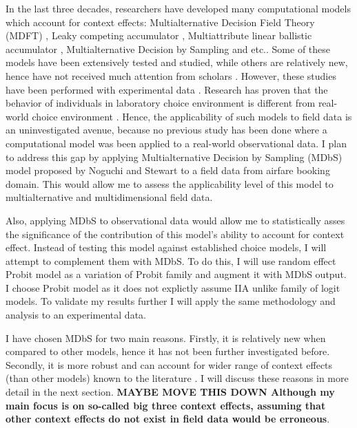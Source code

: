 \documentclass[a4paper,12pt]{article}
\newcommand{\citeyearonly}[1]{\citeyearpar{#1}}
\begin{document}
In the last three decades, researchers have developed many computational models which account for context effects: Multialternative Decision Field Theory (MDFT) \citep{roe2001multialternative}, Leaky competing
accumulator \citep{usher2001time}, Multiattribute linear ballistic accumulator \citep{trueblood2014multiattribute}, Multialternative Decision by Sampling  \citep{noguchi2018multialternative} and etc.. Some of these models have been extensively tested and studied, while others are relatively new, hence have not received much attention from scholars \citep{truebloodEtAl13}. However, these studies have been performed with experimental data \citep{evans2019response, berkowitsch2014rigorously, trueblood2014multiattribute, busemeyer2019cognitive}. Research has proven that the behavior of individuals in laboratory choice environment is different from real-world choice environment \citep{hogarth1989risk}. Hence, the applicability of such models to field data is an uninvestigated avenue, because no previous study has been done where a computational model was been applied to a real-world observational data. I plan to address this gap by applying Multialternative Decision by Sampling (MDbS) model proposed by Noguchi and Stewart \citeyearonly{noguchi2018multialternative} to a field data from airfare booking domain. This would allow me to assess the applicability level of this model to multialternative and multidimensional field data. 

Also, applying MDbS to observational data would allow me to statistically asses the significance of the contribution of this model's ability to account for context effect. Instead of testing this model against established choice models, I will attempt to complement them with MDbS. To do this, I will use random effect Probit model as a variation of Probit family and augment it with MDbS output. I choose Probit model as it does not explictly assume IIA unlike family of logit models. To validate my results further I will apply the same methodology and analysis to an experimental data.

I have chosen MDbS for two main reasons. Firstly, it is relatively new when compared to other models, hence it has not been further investigated before. Secondly, it is more robust and can account for wider range of context effects (than other models) known to the literature \citep{noguchi2018multialternative}. I will discuss these reasons in more detail in the next section. \textbf{MAYBE MOVE THIS DOWN Although my main focus is on so-called big three context effects, assuming that other context effects do not exist in field data would be erroneous}. 
\end{document}
